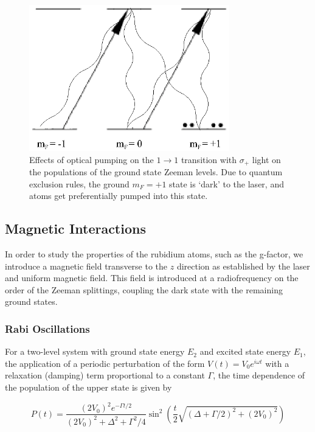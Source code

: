 \begin{figure}[h]
\begin{center}
\includegraphics[height=2.5in]{figures/rbpump.eps}
\caption{\small{Effects of optical pumping on the $1\rightarrow 1$
    transition with $\sigma_+$ light on the populations of the ground
    state Zeeman levels. Due to quantum exclusion rules, the ground
    $m_F = +1$ state is `dark' to the laser, and atoms get
    preferentially pumped into this state.}}
\label{fig:rbpump}
\end{center}
\end{figure}


\subsection{Magnetic Interactions}

In order to study the properties of the rubidium atoms, such as the
g-factor, we introduce a magnetic field transverse to the $z$
direction as established by the laser and uniform magnetic field. This
field is introduced at a radiofrequency on the order of the Zeeman splittings,
coupling the dark state with the remaining ground states. 

\subsubsection{Rabi Oscillations}\label{rabioscillations}

For a two-level system with ground state energy $E_2$ and excited
state energy $E_1$, the application of a periodic perturbation of the
form $V(t) = V_0e^{i\omega t}$ with a relaxation (damping) term
proportional to a constant $\Gamma$, the time dependence of the
population of the upper state is given by

\begin{equation}
P(t) = \frac{(2V_0)^2e^{-\Gamma t/2}}{(2V_0)^2 +\Delta^2 + \Gamma^2/4}\sin^2(\frac{t}{2}\sqrt{(\Delta + \Gamma/2)^2 + (2V_0)^2}) \label{eqn:rabi}
\end{equation}

